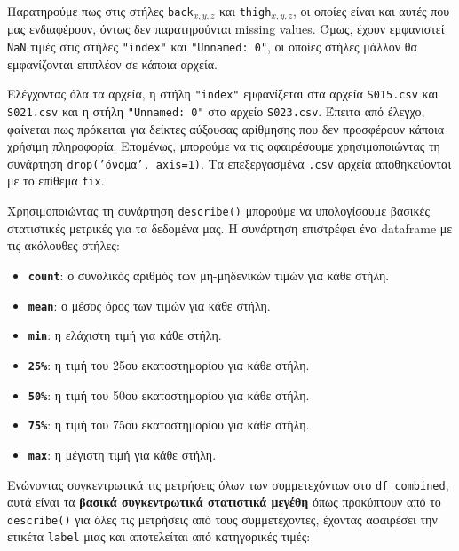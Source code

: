         Παρατηρούμε πως στις στήλες \texttt{back}\(_{x,y,z}\) και \texttt{thigh}\(_{x,y,z}\), οι οποίες είναι και αυτές που μας ενδιαφέρουν, όντως δεν παρατηρούνται missing values.
        Όμως, έχουν εμφανιστεί \texttt{NaN} τιμές στις στήλες \texttt{"index"} και \texttt{"Unnamed: 0"}, οι οποίες στήλες μάλλον θα εμφανίζονται επιπλέον σε κάποια αρχεία.

        Ελέγχοντας όλα τα αρχεία, η στήλη \texttt{"index"} εμφανίζεται στα αρχεία \texttt{S015.csv} και \texttt{S021.csv} και η στήλη \texttt{"Unnamed: 0"} στο αρχείο \texttt{S023.csv}.
        Έπειτα από έλεγχο, φαίνεται πως πρόκειται για δείκτες αύξουσας αρίθμησης που δεν προσφέρουν κάποια χρήσιμη πληροφορία.
        Επομένως, μπορούμε να τις αφαιρέσουμε χρησιμοποιώντας τη συνάρτηση \texttt{drop('όνομα', axis=1)}. Τα επεξεργασμένα \texttt{.csv} αρχεία αποθηκεύονται με το επίθεμα \texttt{fix}.

        Χρησιμοποιώντας τη συνάρτηση \texttt{describe()} μπορούμε να υπολογίσουμε βασικές στατιστικές μετρικές για τα δεδομένα μας.
        Η συνάρτηση επιστρέφει ένα dataframe με τις ακόλουθες στήλες:

        \vspace{-3mm}
        \begin{itemize}[label={\tiny \blacksquare}]
            \addtolength\itemsep{-3mm}
            \item \texttt{\textbf{count}}: ο συνολικός αριθμός των μη-μηδενικών τιμών για κάθε στήλη.
            \item \texttt{\textbf{mean}}: ο μέσος όρος των τιμών για κάθε στήλη.
            \item \texttt{\textbf{min}}: η ελάχιστη τιμή για κάθε στήλη.
            \item \texttt{\textbf{25\%}}: η τιμή του 25ου εκατοστημορίου για κάθε στήλη.
            \item \texttt{\textbf{50\%}}: η τιμή του 50ου εκατοστημορίου για κάθε στήλη.
            \item \texttt{\textbf{75\%}}: η τιμή του 75ου εκατοστημορίου για κάθε στήλη.
            \item \texttt{\textbf{max}}: η μέγιστη τιμή για κάθε στήλη.
        \end{itemize}

        Ενώνοντας συγκεντρωτικά τις μετρήσεις όλων των συμμετεχόντων στο \texttt{df\_combined},
        αυτά είναι τα \textbf{βασικά συγκεντρωτικά στατιστικά μεγέθη} όπως προκύπτουν από το \texttt{describe()}
        για όλες τις μετρήσεις από τους συμμετέχοντες, έχοντας αφαιρέσει την ετικέτα \texttt{label} μιας και αποτελείται από κατηγορικές τιμές:


